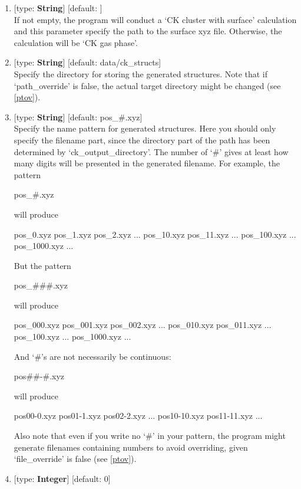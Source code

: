 \documentclass[11pt]{book}
\begin{document}
\begin{enumerate}
\item {} [type: \textbf{String}] [default: ] \\
	If not empty, the program will conduct a `CK cluster with surface' calculation and this parameter specify the path to
	the surface xyz file. Otherwise, the calculation will be `CK gas phase'.
\item {} [type: \textbf{String}] [default: data/ck\_structs] \\
	Specify the directory for storing the generated structures. Note that if `path\_override' is false, the actual target 
	directory might be changed (see \ref{ptov}).
\item {} [type: \textbf{String}] [default: pos\_\#.xyz] \\
	Specify the name pattern for generated structures. Here you should only specify the filename part, since the directory 
	part of the path has been determined by `ck\_output\_directory'. The number of `\#' gives at least how many digits will be 
	presented in the generated filename. For example, the pattern
\begin{everbatim}
pos_#.xyz
\end{everbatim}
	will produce
\begin{everbatim}
pos_0.xyz
pos_1.xyz
pos_2.xyz
...
pos_10.xyz
pos_11.xyz
...
pos_100.xyz
...
pos_1000.xyz
...
\end{everbatim}
	But the pattern
\begin{everbatim}
pos_###.xyz
\end{everbatim}
	will produce
\begin{everbatim}
pos_000.xyz
pos_001.xyz
pos_002.xyz
...
pos_010.xyz
pos_011.xyz
...
pos_100.xyz
...
pos_1000.xyz
...
\end{everbatim}
	And `\#'s are not necessarily be continuous:
\begin{everbatim}
pos##-#.xyz
\end{everbatim}
	will produce
\begin{everbatim}
pos00-0.xyz
pos01-1.xyz
pos02-2.xyz
...
pos10-10.xyz
pos11-11.xyz
...
\end{everbatim}
	Also note that even if you write no `\#' in your pattern, the program might generate filenames containing numbers to 
	avoid overriding, given `file\_override' is false (see \ref{ptov}).
\item {} [type: \textbf{Integer}] [default: 0] \\

\end{enumerate}
\end{document}
